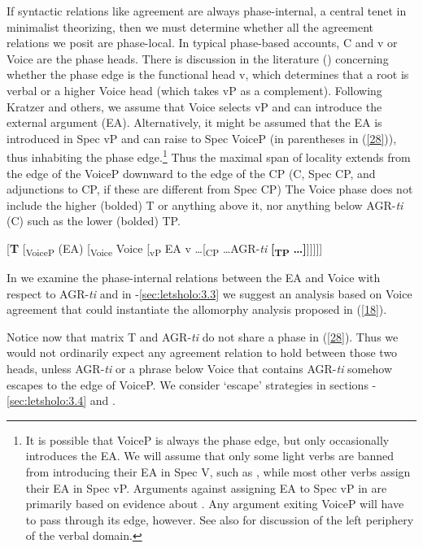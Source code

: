 \documentclass[output=paper,
modfonts
]{langscibook}
\begin{document}
If syntactic relations like agreement are always phase-internal, a central tenet in minimalist theorizing, then we must determine whether all the agreement relations we posit are phase-local. In typical phase-based accounts, C and v or Voice are the phase heads. There is discussion in the literature (\citealt{Kratzer1996,Harley2013,Legate2012,Safir2017})  concerning whether the phase edge is the functional head v, which determines that a root is verbal or a higher Voice head (which takes vP as a complement). 
Following Kratzer and others, we assume that Voice selects vP and can introduce the external argument (EA). Alternatively, it might be assumed that the EA is introduced in Spec vP and can raise to Spec VoiceP (in parentheses in (\ref{28})), thus inhabiting the phase edge.\footnote{\label{fn8}It is possible that VoiceP is always the phase edge, but only occasionally introduces the EA. We will assume that only some light verbs are banned from introducing their EA in Spec V, such as , while most other verbs assign their EA in Spec vP. Arguments against assigning EA to Spec vP in \citet{Pylkkaenen2008} are primarily based on evidence about . Any argument exiting VoiceP will have to pass through its edge, however. See also \citet{Safir2017}  for discussion of the left periphery of the verbal domain.}  Thus the maximal span of locality extends from the edge of the VoiceP downward to the edge of the CP (C, Spec CP, and adjunctions to CP, if these are different from Spec CP) The Voice phase does not include the higher (bolded) T or anything above it, nor anything below AGR-\textit{ti} (C) such as the lower (bolded) TP. 


\ea \label{28} \textup{[\textbf{T}  { }  [\textsubscript{VoiceP} (EA) [\textsubscript{Voice} Voice [\textsubscript{vP} EA v …[\textsubscript{CP} …AGR-\textit{ti} \textbf{[}\textsubscript{\textbf{TP}} \textbf{…]}]]]]]} \z


In  we examine the phase-internal relations between the EA and Voice with respect to AGR-\textit{ti} and in -\ref{sec:letsholo:3.3} we suggest an analysis based on Voice agreement that could instantiate the allomorphy analysis proposed in (\ref{18}). 

	Notice now that matrix T and AGR-\textit{ti} do not share a phase in (\ref{28}). Thus we would not ordinarily expect any agreement relation to hold between those two heads, unless AGR-\textit{ti} or a phrase below Voice that contains AGR-\textit{ti} somehow escapes to the edge of VoiceP. We consider `escape' strategies in sections -\ref{sec:letsholo:3.4} and .
\end{document}
